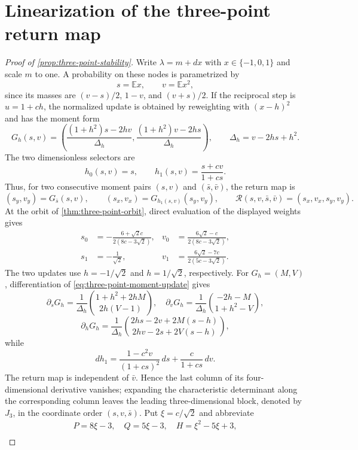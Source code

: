 \documentclass[letterpaper,twoside]{article}
\begin{document}
\section{Linearization of the three-point return map}
\label{sec:threepoint-stability-proof}

\begin{proof}[Proof of \cref{prop:three-point-stability}]
Write $\lambda=m+dx$ with $x\in\{-1,0,1\}$ and scale $m$ to one.  A
probability on these nodes is parametrized by
\[
 s=\mathbb E x,
 \qquad v=\mathbb E x^2,
\]
since its masses are $(v-s)/2$, $1-v$, and $(v+s)/2$.  If the reciprocal
step is $u=1+ch$, the normalized update is obtained by reweighting with
$(x-h)^2$ and has the moment form
\begin{equation}\label{eq:three-point-moment-update}
 G_h(s,v)=
 \left(
 \frac{(1+h^2)s-2hv}{\Delta_h},
 \frac{(1+h^2)v-2hs}{\Delta_h}
 \right),
 \qquad \Delta_h=v-2hs+h^2.
\end{equation}
The two dimensionless selectors are
\[
 h_0(s,v)=s,
 \qquad
 h_1(s,v)=\frac{s+cv}{1+cs}.
\]
Thus, for two consecutive moment pairs $(s,v)$ and $(\bar s,\bar v)$,
the return map is
\[
 (s_y,v_y)=G_{\bar s}(s,v),
 \qquad
 (s_x,v_x)=G_{h_1(s,v)}(s_y,v_y),
 \qquad
 \mathcal R(s,v,\bar s,\bar v)=(s_x,v_x,s_y,v_y).
\]
At the orbit of \cref{thm:three-point-orbit}, direct evaluation of the
displayed weights gives
\begin{align*}
 s_0&=-\frac{6+\sqrt2c}{2(8c-3\sqrt2)},
 &v_0&=\frac{6\sqrt2-c}{2(8c-3\sqrt2)},\\
 s_1&=-\frac1{\sqrt2},
 &v_1&=\frac{6\sqrt2-7c}{2(5c-3\sqrt2)}.
\end{align*}
The two updates use $h=-1/\sqrt2$ and $h=1/\sqrt2$, respectively.  For
$G_h=(M,V)$, differentiation of \eqref{eq:three-point-moment-update} gives
\[
 \partial_s G_h=\frac1{\Delta_h}
 \binom{1+h^2+2hM}{2h(V-1)},
 \quad
 \partial_v G_h=\frac1{\Delta_h}
 \binom{-2h-M}{1+h^2-V},
\]
\[
 \partial_h G_h=\frac1{\Delta_h}
 \binom{2hs-2v+2M(s-h)}{2hv-2s+2V(s-h)},
\]
while
\[
 dh_1=\frac{1-c^2v}{(1+cs)^2}\,ds
       +\frac{c}{1+cs}\,dv.
\]
The return map is independent of $\bar v$.  Hence the last column of its
four-dimensional derivative vanishes; expanding the characteristic
determinant along the corresponding column leaves the leading
three-dimensional block, denoted by $J_3$, in the coordinate order
$(s,v,\bar s)$.  Put $\xi=c/\sqrt2$ and abbreviate
\[
\begin{gathered}
 P=8\xi-3,\quad Q=5\xi-3,\quad H=\xi^2-5\xi+3,\\

\end{gathered}\]
\end{proof}
\end{document}
